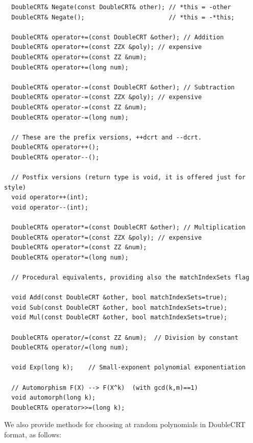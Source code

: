 \documentclass[14pt]{extarticle}
\newcommand{\shaisays}[1]{$\ll$\textsf{#1 Shai}$\gg$}
\def\DoubleCRT{\textsf{DoubleCRT}}
\begin{document}
\begin{verbatim}
  DoubleCRT& Negate(const DoubleCRT& other); // *this = -other
  DoubleCRT& Negate();                       // *this = -*this;

  DoubleCRT& operator+=(const DoubleCRT &other); // Addition
  DoubleCRT& operator+=(const ZZX &poly); // expensive
  DoubleCRT& operator+=(const ZZ &num);
  DoubleCRT& operator+=(long num);

  DoubleCRT& operator-=(const DoubleCRT &other); // Subtraction
  DoubleCRT& operator-=(const ZZX &poly); // expensive
  DoubleCRT& operator-=(const ZZ &num);
  DoubleCRT& operator-=(long num);

  // These are the prefix versions, ++dcrt and --dcrt. 
  DoubleCRT& operator++();
  DoubleCRT& operator--();

  // Postfix versions (return type is void, it is offered just for style)
  void operator++(int);
  void operator--(int);

  DoubleCRT& operator*=(const DoubleCRT &other); // Multiplication
  DoubleCRT& operator*=(const ZZX &poly); // expensive
  DoubleCRT& operator*=(const ZZ &num);
  DoubleCRT& operator*=(long num);

  // Procedural equivalents, providing also the matchIndexSets flag

  void Add(const DoubleCRT &other, bool matchIndexSets=true);
  void Sub(const DoubleCRT &other, bool matchIndexSets=true);
  void Mul(const DoubleCRT &other, bool matchIndexSets=true);

  DoubleCRT& operator/=(const ZZ &num);  // Division by constant
  DoubleCRT& operator/=(long num);

  void Exp(long k);    // Small-exponent polynomial exponentiation

  // Automorphism F(X) --> F(X^k)  (with gcd(k,m)==1)
  void automorph(long k);
  DoubleCRT& operator>>=(long k);
\end{verbatim}

\noindent
We also provide methods for choosing at random polynomials in
{\DoubleCRT} format, as follows:
\end{document}
